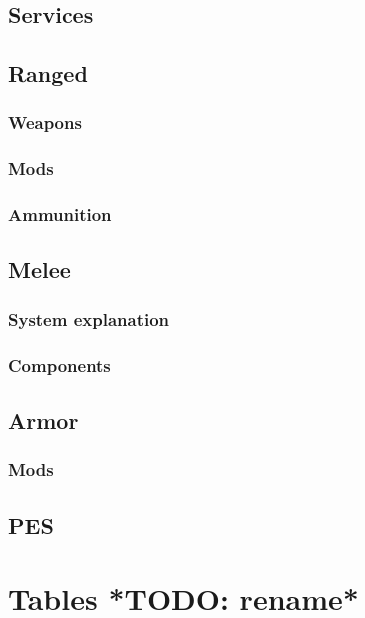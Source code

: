 \documentclass[12pt,a4paper]{book}
\begin{document}
	\section{Services}
	\section{Ranged}
	\subsection{Weapons}
	\subsection{Mods}
	\subsection{Ammunition}
	\section{Melee}
	\subsection{System explanation}
	\subsection{Components}
	\section{Armor}
	\subsection{Mods}
	\section{PES}
	
	\chapter{Tables *TODO: rename*}
\end{document}
